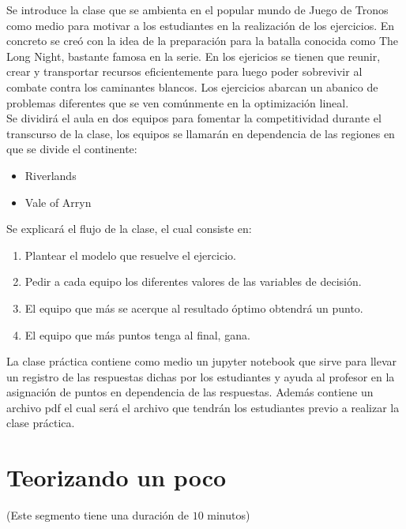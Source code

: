 \documentclass[a4paper,10pt,twocolumn]{article}
\theoremstyle{theorem}
\theoremstyle{definition}
\theoremstyle{remark}
\begin{document}
Se introduce la clase que se ambienta en el popular mundo de Juego de Tronos como medio para motivar a los estudiantes en la realización de los ejercicios. En concreto se creó con la idea de la preparación para la batalla conocida como The Long Night, bastante famosa en la serie. En los ejericios se tienen que reunir, crear y transportar recursos eficientemente para luego poder sobrevivir al combate contra los caminantes blancos. Los ejercicios abarcan un abanico de problemas diferentes que se ven comúnmente en la optimización lineal.\\

Se dividirá el aula en dos equipos para fomentar la competitividad durante el transcurso de la clase, los equipos se llamarán en dependencia de las regiones en que se divide el continente:

\begin{itemize}

	\item Riverlands
	\item Vale of Arryn

\end{itemize}

Se explicará el flujo de la clase, el cual consiste en:

\begin{enumerate}

	\item Plantear el modelo que resuelve el ejercicio.
	\item Pedir a cada equipo los diferentes valores de las variables de decisión.
	\item El equipo que más se acerque al resultado óptimo obtendrá un punto.
	\item El equipo que más puntos tenga al final, gana.

\end{enumerate}

La clase práctica contiene como medio un jupyter notebook que sirve para llevar un registro de las respuestas dichas por los estudiantes y ayuda al profesor en la asignación de puntos en dependencia de las respuestas. Además contiene un archivo pdf el cual será el archivo que tendrán los estudiantes previo a realizar la clase práctica.

\section{Teorizando un poco}\label{sec:teoria}
(Este segmento tiene una duración de $10$ minutos)\\
\end{document}
